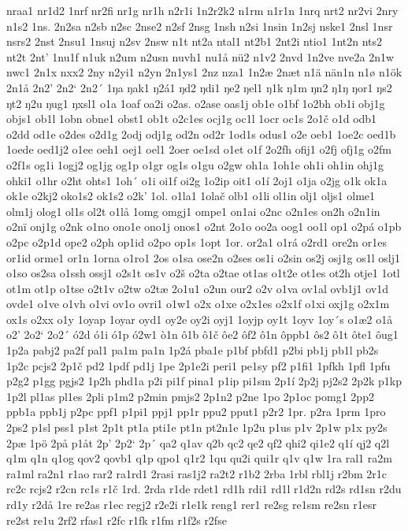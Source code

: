 nraa1
nr1d2
1nrf
nr2fi
nr1g
nr1h
n2r1i
1n2r2k2
n1rm
n1r1n
1nrq
nrt2
nr2vi
2nry
n1s2
1ns.
2n2sa
n2sb
n2sc
2nse2
n2sf
2nsg
1nsh
n2si
1nsin
1n2sj
nske1
2nsl
1nsr
nsrs2
2nst
2nsu1
1nsuj
n2sv
2nsw
n1t
nt2a
ntal1
nt2b1
2nt2i
ntio1
1nt2n
nts2
nt2t
2nt'
1nu1f
n1uk
n2um
n2usn
nuvh1
nu1å
nü2
n1v2
2nvd
1n2ve
nve2a
2n1w
nwc1
2n1x
nxx2
2ny
n2yi1
n2yn
2n1ys1
2nz
nza1
1n2æ
2næt
n1ä
nän1n
n1ø
n1ök
2n1å
2n2'
2n2`
2n2´
1ŋa
ŋak1
ŋ2á1
ŋd2
ŋdi1
ŋe2
ŋel1
ŋ1k
ŋ1m
ŋn2
ŋ1ŋ
ŋor1
ŋs2
ŋt2
ŋ2u
ŋug1
ŋxsl1
o1a
1oaf
oa2i
o2as.
o2ase
oas1j
ob1e
o1bf
1o2bh
ob1i
obj1g
objs1
ob1l
1obn
obne1
obst1
ob1t
o2c1es
ocj1g
oc1l
1ocr
oc1s
2o1č
o1d
odb1
o2dd
od1e
o2des
o2d1g
2odj
odj1g
od2n
od2r
1od1s
odus1
o2e
oeb1
1oe2c
oed1b
1oede
oed1j2
o1ee
oeh1
oej1
oel1
2oer
oe1sd
o1et
o1f
2o2fh
ofij1
o2fj
ofj1g
o2fm
o2f1s
og1i
1ogj2
og1jg
og1p
o1gr
og1s
o1gu
o2gw
oh1a
1oh1e
oh1i
oh1in
ohj1g
ohki1
o1hr
o2ht
ohts1
1oh´
o1i
oi1f
oi2g
1o2ip
oit1
o1í
2oj1
o1ja
o2jg
o1k
ok1a
ok1e
o2kj2
oko1s2
ok1s2
o2k'
1ol.
o1la1
1olač
olb1
o1li
ol1in
olj1
oljs1
olme1
olm1j
olog1
ol1s
ol2t
o1lå
1omg
omgj1
ompe1
on1ai
o2nc
o2n1es
on2h
o2n1in
o2nï
onj1g
o2nk
o1no
ono1e
ono1j
onos1
o2nt
2o1o
oo2a
oog1
oo1l
op1
o2pá
o1pb
o2pc
o2p1d
ope2
o2ph
op1id
o2po
op1s
1opt
1or.
or2a1
o1rá
o2rd1
ore2n
or1es
or1id
orme1
or1n
1orna
o1ro1
2os
o1sa
ose2n
o2ses
os1i
o2sin
os2j
osj1g
os1l
oslj1
o1so
os2sa
o1ssh
ossj1
o2s1t
os1v
o2š
o2ta
o2tae
ot1as
o1t2e
ot1es
ot2h
otje1
1otl
ot1m
ot1p
o1tse
o2t1v
o2tw
o2tæ
2o1u1
o2un
our2
o2v
o1va
ov1al
ovb1j1
ov1d
ovde1
o1ve
o1vh
o1vi
ov1o
ovri1
o1w1
o2x
o1xe
o2x1es
o2x1f
o1xi
oxj1g
o2x1m
ox1s
o2xx
o1y
1oyap
1oyar
oyd1
oy2e
oy2i
oyj1
1oyjp
oy1t
1oyv
1oy´s
o1æ2
o1å
o2'
2o2`
2o2´
ó2d
ó1i
ó1p
ó2w1
ò1n
ô1b
ô1č
ôe2
ôf2
ô1n
ôppb1
ôs2
ô1t
ôte1
ôug1
1p2a
pabj2
pa2f
pal1
pa1m
pa1n
1p2á
pba1e
p1bf
pbfd1
p2bi
pb1j
pb1l
pb2s
1p2c
pcjs2
2p1č
pd2
1pdf
pd1j
1pe
2p1e2i
peri1
pe1sy
pf2
p1fi1
1pfkh
1pfl
1pfu
p2g2
p1gg
pgjs2
1p2h
phd1a
p2i
pi1f
pina1
p1ip
pi1sm
2p1í
2p2j
pj2s2
2p2k
p1kp
1p2l
pl1as
pl1es
2pli
p1m2
p2min
pmjs2
2p1n2
p2ne
1po
2p1oc
pomg1
2pp2
ppb1a
ppb1j
p2pc
ppf1
p1pi1
ppj1
pp1r
ppu2
pput1
p2r2
1pr.
p2ra
1prm
1pro
2ps2
p1sl
pss1
p1st
2p1t
pt1a
pti1e
pt1n
pt2n1e
1p2u
p1us
p1v
2p1w
p1x
py2s
2pæ
1pö
2på
p1åt
2p'
2p2`
2p´
qa2
q1av
q2b
qc2
qe2
qf2
qhi2
qi1e2
q1í
qj2
q2l
q1m
q1n
q1og
qov2
qovb1
q1p
qpo1
q1r2
1qu
qu2i
qui1r
q1v
q1w
1ra
ral1
ra2m
ra1ml
ra2n1
r1ao
rar2
ra1rd1
2rasi
ras1j2
ra2t2
r1b2
2rba
1rbl
rbl1j
r2bm
2r1c
rc2c
rcjs2
r2cn
rc1s
r1č
1rd.
2rda
r1de
rdet1
rd1h
rdi1
rd1l
r1d2n
rd2s
rd1sn
r2du
rd1y
r2då
1re
re2as
r1ec
regj2
r2e2i
r1e1k
reng1
rer1
re2sg
re1sm
re2sn
r1esr
re2st
re1u
2rf2
rfas1
r2fc
r1fk
r1fm
r1f2s
r2fse
